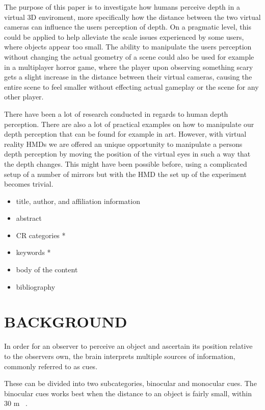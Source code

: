 \documentclass[tog]{acmsiggraph}
\begin{document}
The purpose of this paper is to investigate how humans perceive depth in a virtual 3D enviroment, more specifically how the distance between the two virtual cameras can influence the users perception of depth. On a pragmatic level, this could be applied to help alleviate the scale issues experienced by some users, where objects appear too small. The ability to manipulate the users perception without changing the actual geometry of a scene could also be used for example in a multiplayer horror game, where the player upon observing something scary gets a slight increase in the distance between their virtual cameras, causing the entire scene to feel smaller without effecting actual gameplay or the scene for any other player.    

There have been a lot of research conducted in regards to human depth perception. There are also a lot of practical examples on how to manipulate our depth perception that can be found for example in art. However, with virtual reality HMDs we are offered an unique opportunity to manipulate a persons depth perception by moving the position of the virtual eyes in such a way that the depth changes. This might have been possible before, using a complicated setup of a number of mirrors but with the HMD the set up of the experiment becomes trivial.  


\begin{itemize}
\item title, author, and affiliation information
\item abstract
\item CR categories *
\item keywords *
\item body of the content
\item bibliography
\end{itemize}



\section{BACKGROUND}

In order for an observer to perceive an object and ascertain its position relative to the observers own, the brain interprets multiple sources of information, commonly referred to as cues. 

These can be divided into two subcategories, binocular and monocular cues. The binocular cues works best when the distance to an object is fairly small, within 30 m ~\cite {Palvqvist:2013:DPDS}. 
\end{document}
